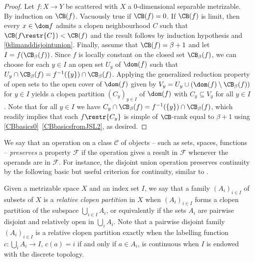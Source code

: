 \begin{proof}
Let $f:X\to Y$ be scattered with $X$ a $0$-dimensional separable metrizable.
By induction on $\CB(f)$. Vacuously true if $\CB(f)=0$. If $\CB(f)$ is limit, then every $x\in \dom f$ admits a clopen neighbourhood $C$ such that $\CB(f\restr{C})<\CB(f)$
and the result follows by induction hypothesis and \cref{0dimanddisjointunion}.
Finally, assume that $\CB(f)=\beta+1$ and let $I= f(\CB_\beta(f))$. Since $f$ is locally constant on the closed set $\CB_\beta(f)$,
we can choose for each $y\in I$ an open set $U_y$ of $\dom(f)$ such that $U_y\cap \CB_\beta(f)=f^{-1}(\{y\})\cap \CB_\beta(f)$.
Applying the generalized reduction property of open sets \cite[22.16]{kechris} to the open cover of $\dom(f)$ given by $V_y=U_y\cup (\dom(f)\setminus \CB_\beta(f))$ for $y\in I$
yields a clopen partition $(C_y)_{y\in I}$ of $\dom(f)$ with $C_y\subseteq V_y$ for all $y\in I$.
Note that for all $y\in I$ we have $C_y\cap \CB_\beta(f)= f^{-1}(\{y\})\cap \CB_\beta(f)$,
which readily implies that each $f\restr{C_y}$ is simple of $\CB$-rank equal to $\beta+1$ using \cref{CBbasics0}~\cref{CBbasicsfromJSL2}, as desired.
\end{proof}

\smallskip

We say that an operation on a class $\mathcal{C}$ of objects -- such as sets, spaces, functions -- \emph{preserves} a property $\mathcal{F}$ if
the operation gives a result in $\mathcal{F}$ whenever the operands are in $\mathcal{F}$.
For instance, the disjoint union operation preserves continuity by the following basic but useful criterion for continuity, similar to \cite[2.2.4 and 2.2.6]{engelking}.

\smallskip


Given a metrizable space $X$ and an index set $I$, we say that a family $(A_i)_{i\in I}$ of subsets of $X$ is a \emph{relative clopen partition} in $X$
when $(A_i)_{i\in I}$ forms a clopen partition of the subspace $\bigcup_{i\in I} A_i$, or equivalently
if the sets $A_i$ are pairwise disjoint and relatively open in $\bigcup_iA_i$.
Note that a pairwise disjoint family $(A_i)_{i\in I}$ is a relative clopen partition exactly when the labelling function $c:\bigcup_i A_i \to I$,
$c(a)=i$ if and only if $a\in A_i$, is continuous when $I$ is endowed with the discrete topology.


